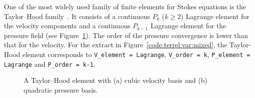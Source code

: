 One of the most widely used family of finite elements for Stokes
equations is the Taylor--Hood family~\citep{TaylorHood1973,Boffi1997}.
It consists of a continuous $P_k$ ($k\geq 2$) Lagrange element for
the velocity components and a continuous $P_{k-1}$ Lagrange element
for the pressure field (see Figure~\ref{fig:terrel:THElements}). The
order of the pressure convergence is lower than that for the velocity.
For the extract in Figure~\ref{code:terrel:var:mixed}, the Taylor-Hood
element corresponds to {\tt V\_element = Lagrange}, {\tt V\_order = k},
{\tt P\_element = Lagrange} and {\tt P\_order = k-1}.
%
\begin{figure}
  \center
  \hspace{2em}
  \caption{A Taylor--Hood element with (a) cubic velocity basis and (b)
  quadratic pressure basis.}
\label{fig:terrel:THElements}
\end{figure}


